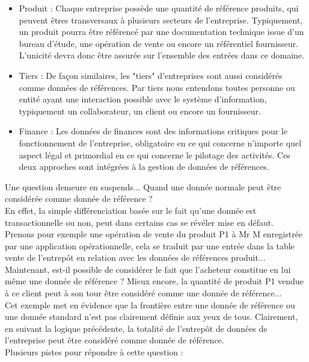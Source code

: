 \begin{itemize}
\item Produit : Chaque entreprise possède une quantité de référence produits, qui peuvent êtres transversaux à plusieurs secteurs de l'entreprise. Typiquement, un produit pourra être référencé par une documentation technique issue d'un bureau d'étude, une opération de vente  ou encore un référentiel fournisseur. L'unicité devra donc être assurée sur l'ensemble des entrées dans ce domaine.
\item Tiers : De façon similaires, les "tiers" d'entreprises sont aussi considérés comme données de références. Par tiers nous entendons toutes personne ou entité ayant une interaction possible avec le système d'information, typiquement un collaborateur, un client ou encore un fournisseur.
\item Finance  : Les données de finances sont des informations critiques pour le fonctionnement de l'entreprise, obligatoire en ce qui concerne n'importe quel aspect légal et primordial en ce qui concerne le pilotage des activités. Ces deux approches sont intégrées à la gestion de données de références.
\end{itemize}

Une question demeure en suspends... Quand une donnée normale peut être considérée comme donnée de référence ?\\
En effet, la simple différenciation basée sur le fait qu'une donnée est transactionnelle ou non, peut dans certains cas se révéler mise en défaut.\\
Prenons pour exemple une opération de vente du produit P1 à Mr M enregistrée par une application opérationnelle, cela se traduit par une entrée dans la table vente de l'entrepôt en relation avec les données de références produit...\\
Maintenant, est-il possible de considérer le fait que l'acheteur constitue en lui même une donnée de référence ? Mieux encore, la quantité de produit P1 vendue à ce client peut à son tour être considéré comme une donnée de référence...\\
Cet exemple met en évidence que la frontière entre une donnée de référence ou une donnée standard n'est pas clairement définie aux yeux de tous. Clairement, en suivant la logique précédente, la totalité de l'entrepôt de données de l'entreprise peut être considéré comme donnée de référence.\\
Plusieurs pistes pour répondre à cette question : \\

